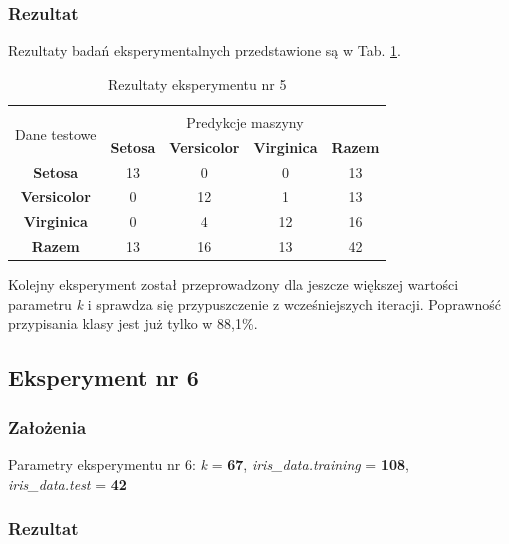 \documentclass[12pt]{article}
\begin{document}
\subsubsection{Rezultat}

Rezultaty badań eksperymentalnych przedstawione są w Tab. \ref{wyniki5}.
\begin{table}[ht!]
 \centering
 \vspace{0.2cm}
  \begin{tabular}{|*{5}{c|}}
  \hline\\[-0.5cm]
   \multirow{2}{*}{Dane testowe} & \multicolumn{4}{c|}{Predykcje maszyny} \\ \cline{2-5}
   & \textbf{Setosa} & \textbf{Versicolor} & \textbf{Virginica} & \textbf{Razem}\\
  \hline
   \textbf{Setosa} & 13 & 0 & 0 & 13  \\ \hline
   \textbf{Versicolor} & 0 & 12 & 1 & 13  \\ \hline
   \textbf{Virginica} & 0 &  4 & 12 & 16  \\ \hline
   \textbf{Razem} & 13 & 16 & 13 & 42 \\
  \hline
 \end{tabular}
 \caption{Rezultaty eksperymentu nr 5}
 \label{wyniki5}
\end{table}

\noindent Kolejny eksperyment został przeprowadzony dla jeszcze większej wartości parametru \textit{k} i sprawdza się przypuszczenie z wcześniejszych iteracji. Poprawność przypisania klasy jest już tylko w 88,1\%. \newline

\subsection{Eksperyment nr 6}
\subsubsection{Założenia}

Parametry eksperymentu nr 6: \textit{k} = \textbf{67}, \textit{iris\_data.training} = \textbf{108}, \\ \textit{iris\_data.test} = \textbf{42}

\subsubsection{Rezultat}
\end{document}
